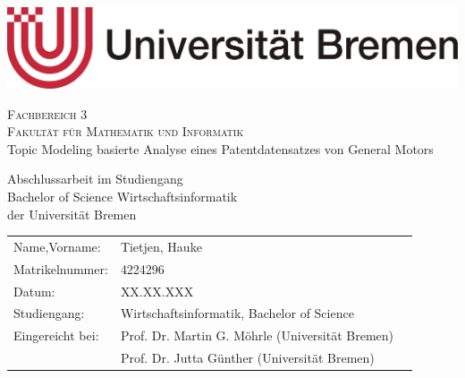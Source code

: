 \begin{titlepage}
\thispagestyle{empty}
  \begin{center}
	
  \includegraphics[scale=0.2]{img/Universitaet_Bremen}\\ \vspace{0.0cm}

	{\Large{\scshape Fachbereich 3}}\\
  {\Large{\scshape Fakultät für Mathematik und Informatik}}\\[2.5cm]
	
	{\LARGE Topic Modeling basierte Analyse eines Patentdatensatzes von General Motors}
  \vspace{2.0cm}
	  
  Abschlussarbeit im Studiengang\\
	Bachelor of Science Wirtschaftsinformatik\\
	der Universität Bremen\\[3cm]

  \begin{tabular}[c]{lll}
		Name,Vorname: & Tietjen, Hauke\\
		Matrikelnummer: & 4224296\\
		Datum: & XX.XX.XXX \\
		Studiengang: & Wirtschaftsinformatik, Bachelor of Science\\
		Eingereicht bei: & Prof. Dr. Martin G. Möhrle (Universität Bremen)\\
		 & Prof. Dr. Jutta Günther (Universität Bremen)
	\end{tabular}
  \end{center}
\end{titlepage}